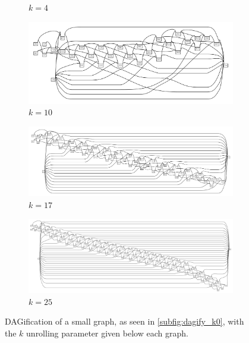 \begin{figure}[htbp!]
\begin{subfigure}[t]{0.49\textwidth}
    \caption{$k=4$} \label{subfig:dagify_k4}
  \end{subfigure}
  \begin{subfigure}[t]{0.49\textwidth}
    \includegraphics[width=1.0\textwidth]{Chapter2/Figs/loopy_dagify10.pdf}
    \caption{$k=10$} \label{subfig:dagify_k10}
  \end{subfigure}
  \begin{subfigure}[t]{0.49\textwidth}
    \includegraphics[width=1.0\textwidth]{Chapter2/Figs/loopy_dagify17.pdf}
    \caption{$k=17$} \label{subfig:dagify_k17}
  \end{subfigure}
  \begin{subfigure}[t]{0.49\textwidth}
    \includegraphics[width=1.0\textwidth]{Chapter2/Figs/loopy_dagify25.pdf}
    \caption{$k=25$} \label{subfig:dagify_k25}
  \end{subfigure}
  \caption[DAGification]{
    DAGification of a small graph, as seen in \ref{subfig:dagify_k0}, with the $k$ unrolling parameter given below each graph.
  }
\label{fig:dagify}
\end{figure}

